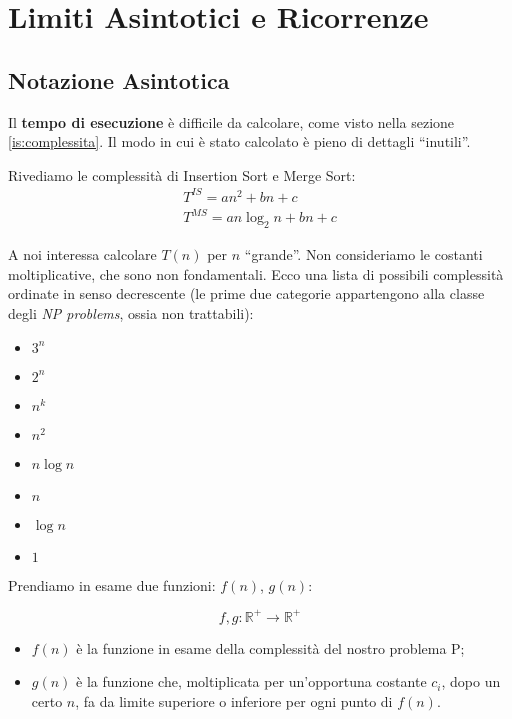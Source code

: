 \section{Limiti Asintotici e Ricorrenze}

\subsection{Notazione Asintotica}
Il \textbf{tempo di esecuzione} è difficile da calcolare, come visto nella sezione \ref{is:complessita}. 
Il modo in cui è stato calcolato è pieno di dettagli ``inutili''.\par
Rivediamo le complessità di Insertion Sort e Merge Sort:
\begin{gather*}
	T^{IS} = an^2 + bn + c \\
	T^{MS} = an \log_2 n + bn + c
\end{gather*}

A noi interessa calcolare $T(n)$ per $n$ ``grande''. Non consideriamo le costanti moltiplicative, che sono non fondamentali. Ecco una lista di possibili complessità ordinate in senso decrescente (le prime due categorie appartengono alla classe degli \emph{NP problems}, ossia non trattabili):

\begin{itemize}[noitemsep]
	\item $3^n$
	\item $2^n$
	\medskip
	\item $n^k$
	\item $n^2$
	\item $n \log n$
	\item $n$
	\item $\log n$
	\item $1$
\end{itemize}

Prendiamo in esame due funzioni: $f(n)$, $g(n)$:

\begin{displaymath}
f, g: \mathbb{R}^+ \rightarrow \mathbb{R}^+
\end{displaymath}

\begin{itemize}
	\item $f(n)$ è la funzione in esame della complessità del nostro problema P;
	\item $g(n)$ è la funzione che, moltiplicata per un'opportuna costante $c_i$, dopo un certo $n$, fa da 
	limite superiore o inferiore per ogni punto di $f(n)$.
\end{itemize}
\newpage
